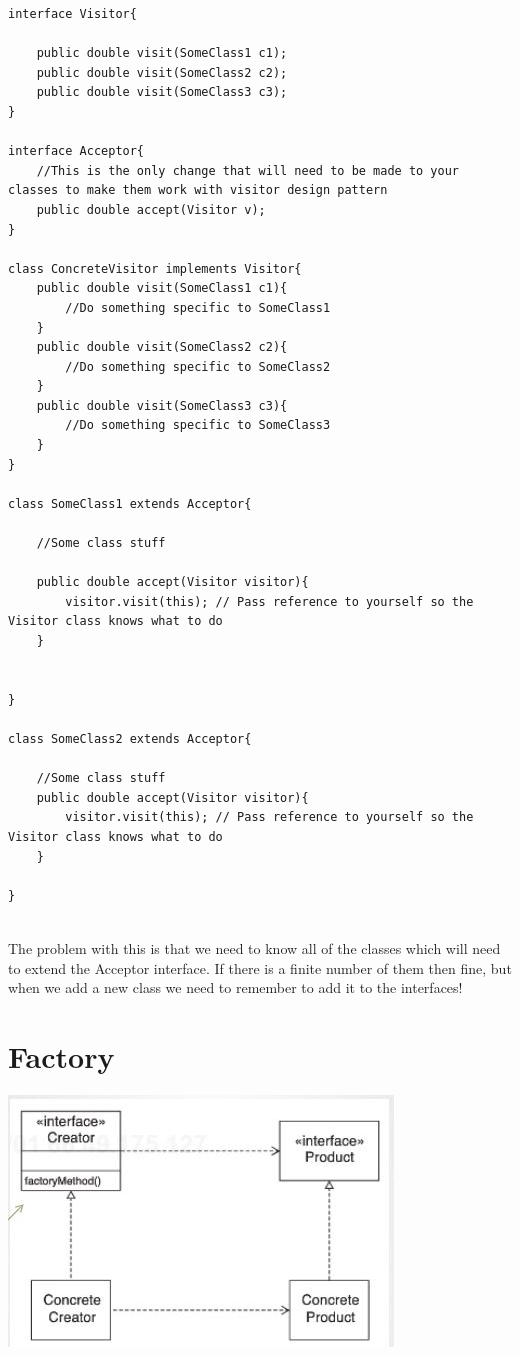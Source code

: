 \documentclass[12pt]{article}
\theoremstyle{definition}
\begin{document}
\begin{lstlisting}
interface Visitor{

	public double visit(SomeClass1 c1);
	public double visit(SomeClass2 c2);
	public double visit(SomeClass3 c3);
}

interface Acceptor{
	//This is the only change that will need to be made to your classes to make them work with visitor design pattern
	public double accept(Visitor v);
}

class ConcreteVisitor implements Visitor{
	public double visit(SomeClass1 c1){
		//Do something specific to SomeClass1
	}
	public double visit(SomeClass2 c2){
		//Do something specific to SomeClass2
	}
	public double visit(SomeClass3 c3){
		//Do something specific to SomeClass3
	}
}

class SomeClass1 extends Acceptor{
	
	//Some class stuff
	
	public double accept(Visitor visitor){
		visitor.visit(this); // Pass reference to yourself so the Visitor class knows what to do
	}

	
}

class SomeClass2 extends Acceptor{

	//Some class stuff
	public double accept(Visitor visitor){
		visitor.visit(this); // Pass reference to yourself so the Visitor class knows what to do
	}

}


\end{lstlisting}

The problem with this is that we need to know all of the classes which will need to extend the Acceptor interface. If there is a finite number of them then fine, but when we add a new class we need to remember to add it to the interfaces!

\section{Factory}
\includegraphics{factory}
\end{document}

